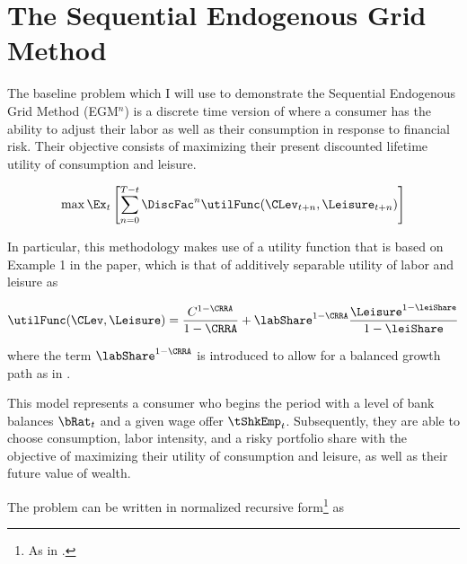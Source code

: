 \documentclass[\econtexRoot/SequentialEGM]{subfiles}
\begin{document}
\notinsubfile{\renewcommand{\econtexRoot}{.}}

\hypertarget{method}{}\par\section{The Sequential Endogenous Grid Method}
\notinsubfile{\label{sec:method}}


The baseline problem which I will use to demonstrate the Sequential Endogenous Grid Method (EGM$^n$) is a discrete time version of \cite{Bodie1992-yp} where a consumer has the ability to adjust their labor as well as their consumption in response to financial risk. Their objective consists of maximizing their present discounted lifetime utility of consumption and leisure.

\begin{equation}
        \max \Ex_{t} \left[ \sum_{n = 0}^{T-t} \DiscFac^{n} \utilFunc(\CLev_{t+n}, \Leisure_{t+n})  \right]
\end{equation}

In particular, this methodology makes use of a utility function that is based on Example 1 in the paper, which is that of additively separable utility of labor and leisure as

\begin{equation}
        \utilFunc(\CLev, \Leisure) = \frac{C^{1-\CRRA}}{1-\CRRA} + \labShare^{1-\CRRA} \frac{\Leisure^{1-\leiShare}}{1-\leiShare}
\end{equation}

where the term $\labShare^{1-\CRRA}$ is introduced to allow for a balanced growth path as in \cite{Mertens2011-ap}.

This model represents a consumer who begins the period with a level of bank balances $\bRat_{t}$ and a given wage offer $\tShkEmp_{t}$. Subsequently, they are able to choose consumption, labor intensity, and a risky portfolio share with the objective of maximizing their utility of consumption and leisure, as well as their future value of wealth.

The problem can be written in normalized recursive form\footnote{As in \cite{Carroll2009-zq}.} as
\end{document}
